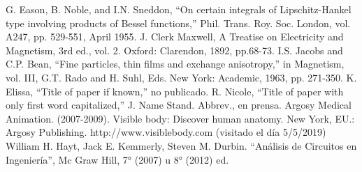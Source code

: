\documentclass[letterpaper, 10 pt, conference]{ieeeconf}  %
\begin{document}
\begin{thebibliography}{99}

	G. Eason, B. Noble, and I.N. Sneddon, ``On certain integrals of Lipschitz-Hankel type involving products of Bessel functions,” Phil. Trans. Roy. Soc. London, vol. A247, pp. 529-551, April 1955. 
	J. Clerk Maxwell, A Treatise on Electricity and Magnetism, 3rd ed., vol. 2. Oxford: Clarendon, 1892, pp.68-73.
	I.S. Jacobs and C.P. Bean, ``Fine particles, thin films and exchange anisotropy,” in Magnetism, vol. III, G.T. Rado and H. Suhl, Eds. New York: Academic, 1963, pp. 271-350.
	K. Elissa, ``Title of paper if known,” no publicado.
	R. Nicole, ``Title of paper with only first word capitalized,” J. Name Stand. Abbrev., en prensa. 
	Argosy Medical Animation. (2007-2009). Visible body: Discover human anatomy. New York, EU.: Argosy Publishing. http://www.visiblebody.com (visitado el d\'ia 5/5/2019)
	William H. Hayt, Jack E. Kemmerly, Steven M. Durbin. ``Análisis de Circuitos en Ingeniería'', Mc Graw Hill, 7° (2007) u 8° (2012) ed.


\end{thebibliography}
\end{document}
